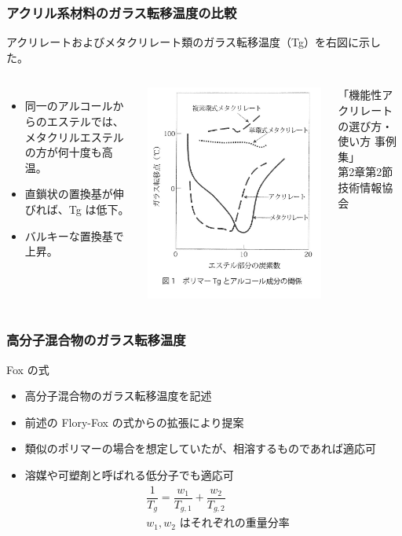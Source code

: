 \documentclass[unicode,12pt]{beamer}%
\begin{document}
\begin{frame}
	\frametitle{アクリル系材料のガラス転移温度の比較}
	アクリレートおよびメタクリレート類のガラス転移温度（Tg）を右図に示した。
		\begin{columns}[T, onlytextwidth]
				\begin{itemize}
					\item 同一のアルコールからのエステルでは、メタクリルエステルの方が何十度も高温。
					\item 直鎖状の置換基が伸びれば、Tg は低下。
					\item バルキーな置換基で上昇。
				\end{itemize}
				\vspace{-2mm}
				\includegraphics[width=.7\textwidth]{Tg.jpg}
				\vspace{-2mm}

				\tiny
			「機能性アクリレートの選び方・使い方 事例集」\\第2章第2節 技術情報協会
		\end{columns}
\end{frame}

\begin{frame}
	\frametitle{高分子混合物のガラス転移温度}
		\begin{block}{Fox の式}
			\begin{itemize}
				\item 高分子混合物のガラス転移温度を記述
				\item 前述の Flory-Fox の式からの拡張により提案
				\item 類似のポリマーの場合を想定していたが、相溶するものであれば適応可
				\item 溶媒や可塑剤と呼ばれる低分子でも適応可
				\begin{align*}
					&\dfrac{1}{T_g} = \dfrac{w_1}{T_{g,1}} + \dfrac{w_2}{T_{g,2}}\\
					&\text{$w_1, w_2$ はそれぞれの重量分率}
				\end{align*}
			\end{itemize}
		\end{block}
\end{frame}
\end{document}

